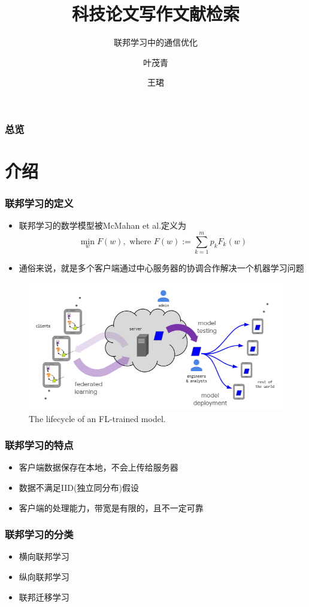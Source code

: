 \documentclass[hyperref={pdfpagelabels=false}]{beamer}
\title{科技论文写作文献检索}
\subtitle{联邦学习中的通信优化}
\author{叶茂青 \and 王珺}
\date{\displaydate{date}}
\begin{document}
\begin{frame}
\titlepage
\end{frame} 

\begin{frame}
	\frametitle{总览}
	\tableofcontents
\end{frame} 

\section{介绍}
\begin{frame}
	\tableofcontents[currentsection]
\end{frame} 

\begin{frame}
	\frametitle{联邦学习的定义}
	\begin{itemize}
		\item 联邦学习的数学模型被McMahan et al.\cite{mcmahan2016communication}定义为$$\min _{w} F(w), \text { where } F(w):=\sum_{k=1}^{m} p_{k} F_{k}(w)$$
		\item 通俗来说，就是多个客户端通过中心服务器的协调合作解决一个机器学习问题
	\end{itemize}
	\begin{figure}
		\centering
		\includegraphics[width=.6\textwidth]{./figure/1.png}
		\caption{The lifecycle of an FL-trained model.\cite{kairouz2019advances}}
	\end{figure}
\end{frame}


\begin{frame}
	\frametitle{联邦学习的特点}
	\begin{itemize}
		\item<+-> 客户端数据保存在本地，不会上传给服务器
		\item<+-> 数据不满足IID(独立同分布)假设
		\item<+-> 客户端的处理能力，带宽是有限的，且不一定可靠
	\end{itemize}
\end{frame}

\begin{frame}
	\frametitle{联邦学习的分类}
	\begin{itemize}
		\item 横向联邦学习
		\item 纵向联邦学习
		\item 联邦迁移学习
	\end{itemize}
\end{frame}
\end{document}
